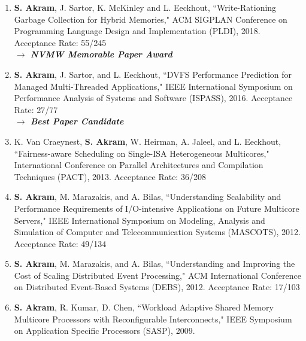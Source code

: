 \documentclass[singlecolumn,singlespace,11pt]{article}
\begin{document}
\begin{enumerate}
\item
\textbf{S. Akram}, J. Sartor, K. McKinley and L. Eeckhout, ``Write-Rationing Garbage Collection for Hybrid Memories," ACM SIGPLAN Conference on Programming Language Design and Implementation (PLDI), 2018. {\color{blue} Acceptance Rate: 55/245}
\\
{\color{BrickRed} \textbf{$\longrightarrow$ \emph{NVMW Memorable Paper Award}}}

\item
\textbf{S. Akram}, J. Sartor, and L. Eeckhout, ``DVFS Performance Prediction for Managed Multi-Threaded Applications," IEEE International Symposium on Performance Analysis 
of Systems and Software (ISPASS), 2016. {\color{blue} Acceptance Rate: 27/77} 
\\
{\color{BrickRed} \textbf{$\longrightarrow$ \emph{Best Paper Candidate}}}

\item
K. Van Craeynest, \textbf{S. Akram}, W. Heirman, A. Jaleel, and L. Eeckhout, ``Fairness-aware Scheduling on Single-ISA Heterogeneous Multicores," 
International Conference on Parallel Architectures and Compilation Techniques (PACT), 2013. {\color{blue} Acceptance Rate: 36/208}

\item
\textbf{S. Akram}, M. Marazakis, and A. Bilas, ``Understanding Scalability and Performance Requirements of I/O-intensive Applications
on Future Multicore Servers," IEEE International Symposium on Modeling, Analysis and Simulation of Computer and 
Telecommunication Systems (MASCOTS), 2012. {\color{blue} Acceptance Rate: 49/134}

\item 
\textbf{S. Akram}, M. Marazakis, and A. Bilas, ``Understanding and Improving the Cost of Scaling Distributed Event Processing," 
ACM International Conference on Distributed Event-Based Systems (DEBS), 2012. {\color{blue} Acceptance Rate: 17/103}

\item
\textbf{S. Akram}, R. Kumar, D. Chen, ``Workload Adaptive Shared Memory Multicore Processors with Reconfigurable Interconnects,"
IEEE Symposium on Application Specific Processors (SASP), 2009. 


\end{enumerate}
\end{document}
